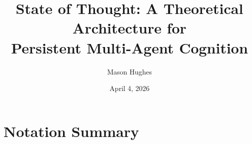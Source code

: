 \documentclass[11pt,a4paper]{article}
\title{State of Thought: A Theoretical Architecture for\\Persistent Multi-Agent Cognition}
\author{Mason Hughes}
\date{April 4, 2026}
\begin{document}
\maketitle

\begin{abstract}

\end{abstract}

\section*{Notation Summary}

\FloatBarrier













\appendix

\end{document}
